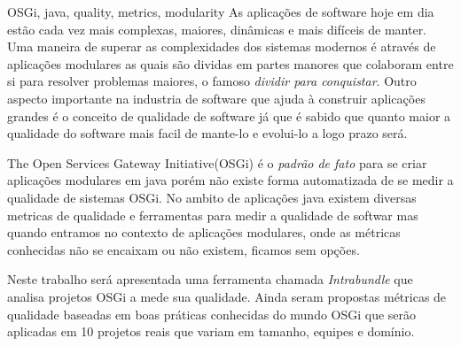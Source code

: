 \begin{englishabstract}{}{OSGi, java, quality, metrics, modularity}
As aplicações de software hoje em dia estão cada vez mais complexas, maiores, dinâmicas e mais difíceis de manter. Uma maneira de superar as complexidades dos sistemas modernos é através de aplicações modulares as quais são dividas em partes manores que colaboram entre si para resolver problemas maiores, o famoso \emph{dividir para conquistar}. Outro aspecto importante na industria de software que ajuda à construir aplicações grandes é o conceito de qualidade de software já que é sabido que quanto maior a qualidade do software mais facil de mante-lo e evolui-lo a logo prazo será.

The Open Services Gateway Initiative(OSGi) é o \emph{padrão de fato} para se criar aplicações modulares em java porém não existe forma automatizada de se medir a qualidade de sistemas OSGi. No ambito de aplicações java existem diversas metricas de qualidade e ferramentas para medir a qualidade de softwar mas quando entramos no contexto de aplicações modulares, onde as métricas conhecidas não se encaixam ou não existem, ficamos sem opções. 

Neste trabalho será apresentada uma ferramenta chamada \emph{Intrabundle} que analisa projetos OSGi a mede sua qualidade. Ainda seram propostas métricas de qualidade baseadas em boas práticas conhecidas do mundo OSGi que serão aplicadas em 10 projetos reais que variam em tamanho, equipes e domínio.
\end{englishabstract}
